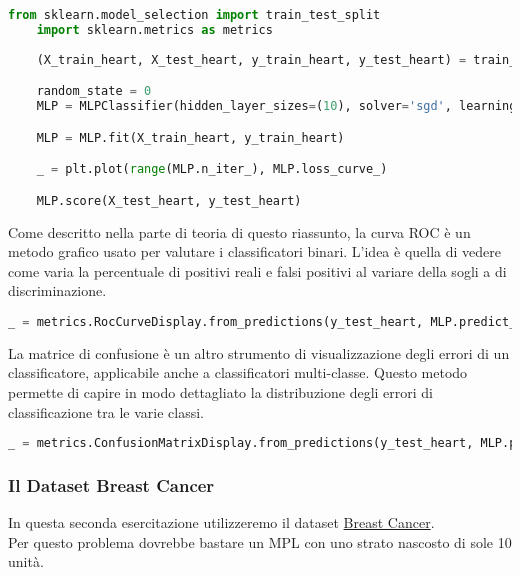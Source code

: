 \documentclass[12pt, a4paper]{article}
\begin{document}
\begin{lstlisting}[language=Python, caption=Importazione delle Librerie e Apprendimento con Funzione di Costo]
    from sklearn.model_selection import train_test_split
    import sklearn.metrics as metrics
    
    (X_train_heart, X_test_heart, y_train_heart, y_test_heart) = train_test_split(heart_disease_samples, heart_disease_targets)

    random_state = 0
    MLP = MLPClassifier(hidden_layer_sizes=(10), solver='sgd', learning_rate_init=0.0005, max_iter=1000, random_state=random_state)

    MLP = MLP.fit(X_train_heart, y_train_heart)

    _ = plt.plot(range(MLP.n_iter_), MLP.loss_curve_)

    MLP.score(X_test_heart, y_test_heart)
\end{lstlisting}

Come descritto nella parte di teoria di questo riassunto, la curva ROC è un metodo grafico usato per valutare i classificatori binari. L'idea è quella di vedere come varia la percentuale di positivi reali e falsi positivi al variare della sogli a di discriminazione.

\begin{lstlisting}[language=Python, caption=Curva ROC e AUC]
    _ = metrics.RocCurveDisplay.from_predictions(y_test_heart, MLP.predict_proba(X_test_heart)[:, 1])
\end{lstlisting}

La matrice di confusione è un altro strumento di visualizzazione degli errori di un classificatore, applicabile anche a classificatori multi-classe. Questo metodo permette di capire in modo dettagliato la distribuzione degli errori di classificazione tra le varie classi.

\begin{lstlisting}[language=Python, caption=Rappresentazione Grafica della Matrice di Confusione]
    _ = metrics.ConfusionMatrixDisplay.from_predictions(y_test_heart, MLP.predict(X_test_heart))
\end{lstlisting}

\subsubsection{Il Dataset Breast Cancer}
In questa seconda esercitazione utilizzeremo il dataset \href{https://archive.ics.uci.edu/ml/datasets/breast+cancer+wisconsin+(diagnostic)}{Breast Cancer}.\\
Per questo problema dovrebbe bastare un MPL con uno strato nascosto di sole 10 unità.
\end{document}
